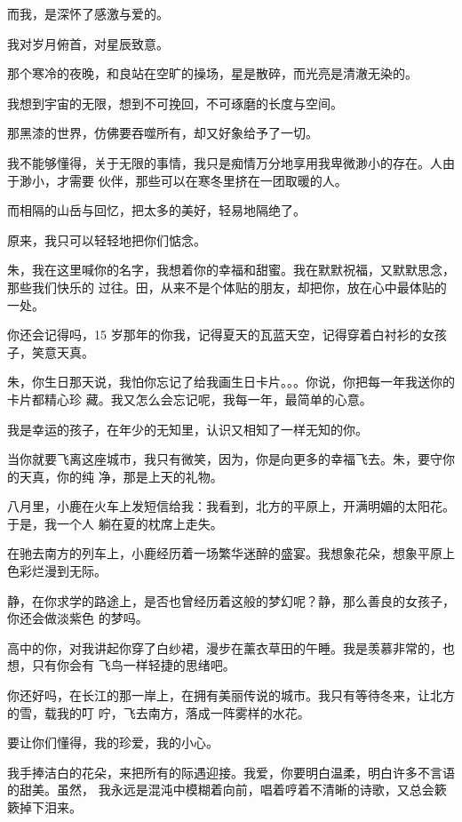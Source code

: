 		而我，是深怀了感激与爱的。\par
		我对岁月俯首，对星辰致意。\par
		那个寒冷的夜晚，和良站在空旷的操场，星是散碎，而光亮是清澈无染的。

		我想到宇宙的无限，想到不可挽回，不可琢磨的长度与空间。\par
		那黑漆的世界，仿佛要吞噬所有，却又好象给予了一切。\par
		我不能够懂得，关于无限的事情，我只是痴情万分地享用我卑微渺小的存在。人由于渺小，才需要
	伙伴，那些可以在寒冬里挤在一团取暖的人。\par
		而相隔的山岳与回忆，把太多的美好，轻易地隔绝了。\par
		原来，我只可以轻轻地把你们惦念。


		\vspace{1em}
		朱，我在这里喊你的名字，我想着你的幸福和甜蜜。我在默默祝福，又默默思念，那些我们快乐的
	过往。田，从来不是个体贴的朋友，却把你，放在心中最体贴的一处。

		你还会记得吗，15 岁那年的你我，记得夏天的瓦蓝天空，记得穿着白衬衫的女孩子，笑意天真。

		朱，你生日那天说，我怕你忘记了给我画生日卡片。。。你说，你把每一年我送你的卡片都精心珍
	藏。我又怎么会忘记呢，我每一年，最简单的心意。

		我是幸运的孩子，在年少的无知里，认识又相知了一样无知的你。

		当你就要飞离这座城市，我只有微笑，因为，你是向更多的幸福飞去。朱，要守你的天真，你的纯
	净，那是上天的礼物。


		\vspace{1em}
		八月里，小鹿在火车上发短信给我：我看到，北方的平原上，开满明媚的太阳花。于是，我一个人
	躺在夏的枕席上走失。

		在驰去南方的列车上，小鹿经历着一场繁华迷醉的盛宴。我想象花朵，想象平原上色彩烂漫到无际。

		静，在你求学的路途上，是否也曾经历着这般的梦幻呢？静，那么善良的女孩子，你还会做淡紫色
	的梦吗。

		高中的你，对我讲起你穿了白纱裙，漫步在薰衣草田的午睡。我是羡慕非常的，也想，只有你会有
	飞鸟一样轻捷的思绪吧。

		你还好吗，在长江的那一岸上，在拥有美丽传说的城市。我只有等待冬来，让北方的雪，载我的叮
	咛，飞去南方，落成一阵雾样的水花。


		\vspace{1em}
		要让你们懂得，我的珍爱，我的小心。

		我手捧洁白的花朵，来把所有的际遇迎接。我爱，你要明白温柔，明白许多不言语的甜美。虽然，
	我永远是混沌中模糊着向前，唱着哼着不清晰的诗歌，又总会簌簌掉下泪来。

